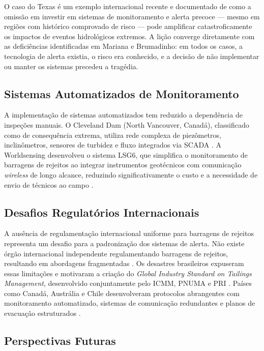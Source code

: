 O caso do Texas é um exemplo internacional recente e documentado de como
a omissão em investir em sistemas de monitoramento e alerta precoce --- mesmo
em regiões com histórico comprovado de risco --- pode amplificar
catastroficamente os impactos de eventos hidrológicos extremos. A lição
converge diretamente com as deficiências identificadas em Mariana e
Brumadinho: em todos os casos, a tecnologia de alerta existia, o risco era
conhecido, e a decisão de não implementar ou manter os sistemas precedeu
a tragédia.

\subsection{Sistemas Automatizados de Monitoramento}

A implementação de sistemas automatizados tem reduzido a dependência de inspeções manuais. O Cleveland Dam (North Vancouver, Canadá), classificado como de consequência extrema, utiliza rede complexa de piezômetros, inclinômetros, sensores de turbidez e fluxo integrados via SCADA \cite{klohn2021surveillance}. A Worldsensing desenvolveu o sistema LSG6, que simplifica o monitoramento de barragens de rejeitos ao integrar instrumentos geotécnicos com comunicação \textit{wireless} de longo alcance, reduzindo significativamente o custo e a necessidade de envio de técnicos ao campo \cite{worldsensing2024canadian, minedesign2021tailings}.

\subsection{Desafios Regulatórios Internacionais}

A ausência de regulamentação internacional uniforme para barragens de rejeitos representa um desafio para a padronização dos sistemas de alerta. Não existe órgão internacional independente regulamentando barragens de rejeitos, resultando em abordagens fragmentadas \cite{londonmining2021explainer, earthworks2024safety}. Os desastres brasileiros expuseram essas limitações e motivaram a criação do \textit{Global Industry Standard on Tailings Management}, desenvolvido conjuntamente pelo ICMM, PNUMA e PRI \cite{icmm2020global}. Países como Canadá, Austrália e Chile desenvolveram protocolos abrangentes com monitoramento automatizado, sistemas de comunicação redundantes e planos de evacuação estruturados \cite{bentley2025solucoes}.

\subsection{Perspectivas Futuras}


